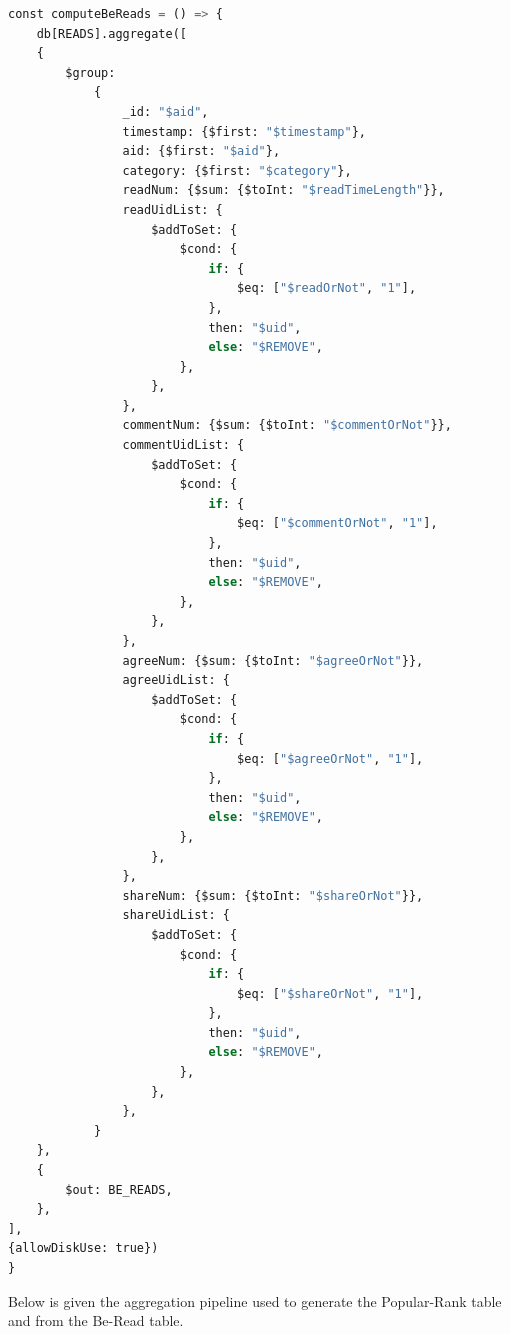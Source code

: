 \documentclass{report}
\begin{document}
\begin{lstlisting}[language=python, caption=Aggregation pipeline for generating Be-Read table]
const computeBeReads = () => {
    db[READS].aggregate([
    {
        $group:
            {
                _id: "$aid",
                timestamp: {$first: "$timestamp"},
                aid: {$first: "$aid"},
                category: {$first: "$category"},
                readNum: {$sum: {$toInt: "$readTimeLength"}},
                readUidList: {
                    $addToSet: {
                        $cond: {
                            if: {
                                $eq: ["$readOrNot", "1"],
                            },
                            then: "$uid",
                            else: "$REMOVE",
                        },
                    },
                },
                commentNum: {$sum: {$toInt: "$commentOrNot"}},
                commentUidList: {
                    $addToSet: {
                        $cond: {
                            if: {
                                $eq: ["$commentOrNot", "1"],
                            },
                            then: "$uid",
                            else: "$REMOVE",
                        },
                    },
                },
                agreeNum: {$sum: {$toInt: "$agreeOrNot"}},
                agreeUidList: {
                    $addToSet: {
                        $cond: {
                            if: {
                                $eq: ["$agreeOrNot", "1"],
                            },
                            then: "$uid",
                            else: "$REMOVE",
                        },
                    },
                },
                shareNum: {$sum: {$toInt: "$shareOrNot"}},
                shareUidList: {
                    $addToSet: {
                        $cond: {
                            if: {
                                $eq: ["$shareOrNot", "1"],
                            },
                            then: "$uid",
                            else: "$REMOVE",
                        },
                    },
                },
            }
    },
    {
        $out: BE_READS,
    },
],
{allowDiskUse: true})
}
\end{lstlisting}
    Below is given the aggregation pipeline used to generate the Popular-Rank table and from the Be-Read table.
\end{document}

